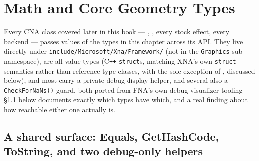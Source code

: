 \chapter{Math and Core Geometry Types}
\label{ch:math-core-types}

Every CNA class covered later in this book --- , ,
every stock effect, every backend --- passes values of the types in this chapter across its
API. They live directly under \texttt{include/Microsoft/Xna/Framework/} (not in the
\texttt{Graphics} sub-namespace), are all value types (C\texttt{++} \texttt{struct}s, matching
XNA's own \texttt{struct} semantics rather than reference-type classes, with the sole
exception of , discussed below), and most carry a private
debug-display helper, and several also a \texttt{CheckForNaNs()} guard, both ported from FNA's
own debug-visualizer tooling --- \S\ref{sec:shared-debug-surface} below documents exactly which
types have which, and a real finding about how reachable either one actually is.

\section{A shared surface: Equals, GetHashCode, ToString, and two debug-only helpers}
\label{sec:shared-debug-surface}


